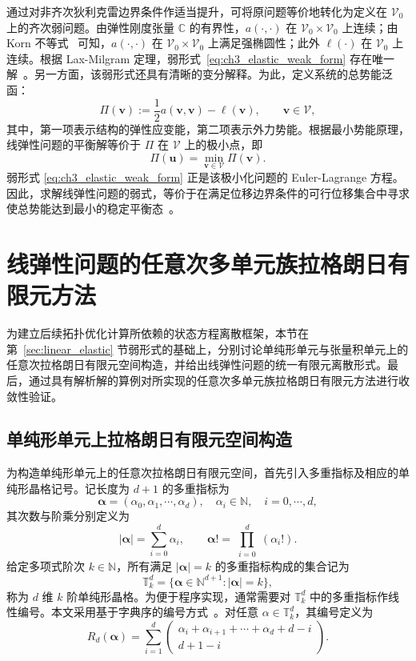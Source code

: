 通过对非齐次狄利克雷边界条件作适当提升，可将原问题等价地转化为定义在 $\mathcal{V}_0$ 上的齐次弱问题。由弹性刚度张量 $\mathbb{C}$ 的有界性，$a(\cdot,\cdot)$ 在 $\mathcal{V}_0\times\mathcal{V}_0$ 上连续；由 Korn 不等式~\cite{brennerMathematicalTheoryFinite2008} 可知，$a(\cdot,\cdot)$ 在 $\mathcal{V}_0\times\mathcal{V}_0$ 上满足强椭圆性；此外 $\ell(\cdot)$ 在 $\mathcal{V}_0$ 上连续。根据 Lax-Milgram 定理，弱形式~\eqref{eq:ch3_elastic_weak_form} 存在唯一解~\cite{ciarletFiniteElementMethod2002a}。另一方面，该弱形式还具有清晰的变分解释。为此，定义系统的总势能泛函：
\[
\Pi(\boldsymbol{v}) :=\frac{1}{2}a(\boldsymbol{v},\boldsymbol{v})-\ell(\boldsymbol{v}), \qquad \boldsymbol{v}\in\mathcal{V},
\]
其中，第一项表示结构的弹性应变能，第二项表示外力势能。根据最小势能原理，线弹性问题的平衡解等价于 $\Pi$ 在 $\mathcal{V}$ 上的极小点，即
\[
\Pi(\boldsymbol{u})=\min_{\boldsymbol{v}\in\mathcal{V}}\Pi(\boldsymbol{v}).
\]
弱形式 \eqref{eq:ch3_elastic_weak_form} 正是该极小化问题的 Euler-Lagrange 方程。因此，求解线弹性问题的弱式，等价于在满足位移边界条件的可行位移集合中寻求使总势能达到最小的稳定平衡态~\cite{zienkiewiczFiniteElementMethod2005}。


\section{线弹性问题的任意次多单元族拉格朗日有限元方法}
\label{sec:lagrange_fem}

为建立后续拓扑优化计算所依赖的状态方程离散框架，本节在第~\ref{sec:linear_elastic} 节弱形式的基础上，分别讨论单纯形单元与张量积单元上的任意次拉格朗日有限元空间构造，并给出线弹性问题的统一有限元离散形式。最后，通过具有解析解的算例对所实现的任意次多单元族拉格朗日有限元方法进行收敛性验证。


\subsection{单纯形单元上拉格朗日有限元空间构造}
\label{subsec:simplex_lagrange}

为构造单纯形单元上的任意次拉格朗日有限元空间，首先引入多重指标及相应的单纯形晶格记号。记长度为 $d+1$ 的多重指标为
\[
\boldsymbol{\alpha} = (\alpha_0,\alpha_1,\cdots,\alpha_d),\quad\alpha_i\in\mathbb{N},\quad{i}=0,\cdots,d,
\]
其次数与阶乘分别定义为
\[|\boldsymbol{\alpha}| = \sum_{i=0}^{d}\alpha_i,\qquad\boldsymbol{\alpha}! = \prod_{\substack{i=0}}^d(\alpha_i!).
\]
给定多项式阶次 $k\in\mathbb{N}$，所有满足 $|\boldsymbol{\alpha}| = k$ 的多重指标构成的集合记为
\[
\mathbb{T}_k^d = \{\boldsymbol{\alpha}\in\mathbb{N}^{d+1}:|\boldsymbol{\alpha}| = k\},
\]
称为 $d$ 维 $k$ 阶单纯形晶格。为便于程序实现，通常需要对 $\mathbb{T}_k^d$ 中的多重指标作线性编号。本文采用基于字典序的编号方式~\cite{chenGeometricDecompositionEfficient2024b}。对任意 $\alpha\in\mathbb{T}_k^d$，其编号定义为
\[
R_d(\boldsymbol{\alpha}) = \sum_{i=1}^d
\begin{pmatrix}
	\alpha_i+\alpha_{i+1}+\cdots+\alpha_d+d-i\\
	d+1-i
\end{pmatrix}.
\]

